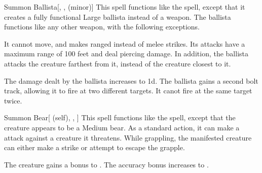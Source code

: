 \lowercase{\hypertarget{spell:Summon Ballista}{}}\label{spell:Summon Ballista}
\begin{freeability}[Rank 3]{\hypertarget{spell:Summon Ballista}{Summon Ballista}}[, ,  (minor)]
This spell functions like the  spell, except that it creates a fully functional Large ballista instead of a weapon.
The ballista functions like any other weapon, with the following exceptions.

It cannot move, and makes ranged  instead of melee strikes.
Its attacks have a maximum range of 100 feet and deal piercing damage.
In addition, the ballista attacks the creature farthest from it, instead of the creature closest to it.

\rankline
{} The damage dealt by the ballista increases to  \minus1d.
 The ballista gains a second bolt track, allowing it to fire at two different targets.
It canot fire at the same target twice.
\end{freeability}
\vspace{0.25em}



\lowercase{\hypertarget{spell:Summon Bear}{}}\label{spell:Summon Bear}
\begin{attuneability}[Rank 3]{\hypertarget{spell:Summon Bear}{Summon Bear}}[ (self), , ]
This spell functions like the  spell, except that the creature appears to be a Medium bear.
As a standard action, it can make a  attack against a creature it threatens.
While grappling, the manifested creature can either make a strike or attempt to escape the grapple.

\rankline
{} The creature gains a  bonus to .
 The accuracy bonus increases to .
\end{attuneability}
\vspace{0.25em}



